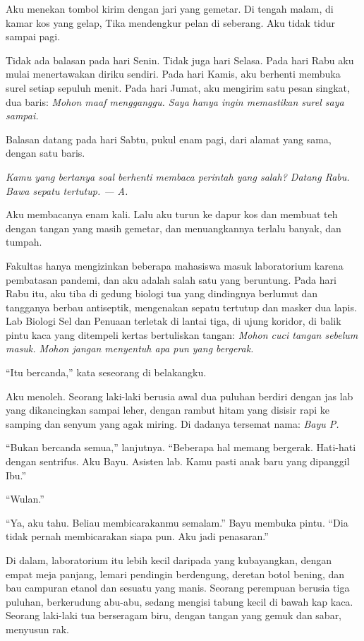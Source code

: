 \documentclass[11pt,twoside,openany]{book}
\makeatletter
\newcommand{\scenebreak}{\par\vspace{0.9em}{\centering\textsc{*\hspace{0.7em}*\hspace{0.7em}*}\par}\vspace{0.9em}\@afterindentfalse\@afterheading}
\makeatother
\begin{document}
Aku menekan tombol kirim dengan jari yang gemetar. Di tengah malam, di kamar kos yang gelap, Tika mendengkur pelan di seberang. Aku tidak tidur sampai pagi.

Tidak ada balasan pada hari Senin. Tidak juga hari Selasa. Pada hari Rabu aku mulai menertawakan diriku sendiri. Pada hari Kamis, aku berhenti membuka surel setiap sepuluh menit. Pada hari Jumat, aku mengirim satu pesan singkat, dua baris: \emph{Mohon maaf mengganggu. Saya hanya ingin memastikan surel saya sampai.}

Balasan datang pada hari Sabtu, pukul enam pagi, dari alamat yang sama, dengan satu baris.

\emph{Kamu yang bertanya soal berhenti membaca perintah yang salah? Datang Rabu. Bawa sepatu tertutup. --- A.}

Aku membacanya enam kali. Lalu aku turun ke dapur kos dan membuat teh dengan tangan yang masih gemetar, dan menuangkannya terlalu banyak, dan tumpah.

\scenebreak
Fakultas hanya mengizinkan beberapa mahasiswa masuk laboratorium karena pembatasan pandemi, dan aku adalah salah satu yang beruntung. Pada hari Rabu itu, aku tiba di gedung biologi tua yang dindingnya berlumut dan tangganya berbau antiseptik, mengenakan sepatu tertutup dan masker dua lapis. Lab Biologi Sel dan Penuaan terletak di lantai tiga, di ujung koridor, di balik pintu kaca yang ditempeli kertas bertuliskan tangan: \emph{Mohon cuci tangan sebelum masuk. Mohon jangan menyentuh apa pun yang bergerak.}

``Itu bercanda,'' kata seseorang di belakangku.

Aku menoleh. Seorang laki-laki berusia awal dua puluhan berdiri dengan jas lab yang dikancingkan sampai leher, dengan rambut hitam yang disisir rapi ke samping dan senyum yang agak miring. Di dadanya tersemat nama: \emph{Bayu P.}

``Bukan bercanda semua,'' lanjutnya. ``Beberapa hal memang bergerak. Hati-hati dengan sentrifus. Aku Bayu. Asisten lab. Kamu pasti anak baru yang dipanggil Ibu.''

``Wulan.''

``Ya, aku tahu. Beliau membicarakanmu semalam.'' Bayu membuka pintu. ``Dia tidak pernah membicarakan siapa pun. Aku jadi penasaran.''

Di dalam, laboratorium itu lebih kecil daripada yang kubayangkan, dengan empat meja panjang, lemari pendingin berdengung, deretan botol bening, dan bau campuran etanol dan sesuatu yang manis. Seorang perempuan berusia tiga puluhan, berkerudung abu-abu, sedang mengisi tabung kecil di bawah kap kaca. Seorang laki-laki tua berseragam biru, dengan tangan yang gemuk dan sabar, menyusun rak.
\end{document}
